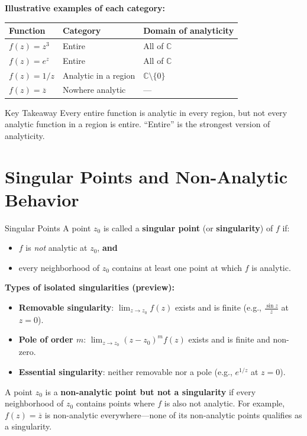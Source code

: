 \documentclass[12pt,a4paper]{article}
\begin{document}
\textbf{Illustrative examples of each category:}

\begin{center}
\begin{tabular}{lll}
\toprule
\textbf{Function} & \textbf{Category} & \textbf{Domain of analyticity} \\
\midrule
$f(z) = z^{3}$ & Entire & All of $\mathbb{C}$ \\
$f(z) = e^{z}$ & Entire & All of $\mathbb{C}$ \\
$f(z) = 1/z$ & Analytic in a region & $\mathbb{C}\setminus\{0\}$ \\
$f(z) = \overline{z}$ & Nowhere analytic & --- \\
\bottomrule
\end{tabular}
\end{center}

\begin{learnbox}{Key Takeaway}
Every entire function is analytic in every region, but not every analytic function in a region is entire. ``Entire'' is the strongest version of analyticity.
\end{learnbox}

\section{Singular Points and Non-Analytic Behavior}

\begin{infobox}{Singular Points}
A point $z_0$ is called a \textbf{singular point} (or \textbf{singularity}) of $f$ if:
\begin{itemize}
  \item $f$ is \emph{not} analytic at $z_0$, \textbf{and}
  \item every neighborhood of $z_0$ contains at least one point at which $f$
        is analytic.
\end{itemize}

\textbf{Types of isolated singularities (preview):}
\begin{itemize}
  \item \textbf{Removable singularity}: $\lim_{z\to z_0}f(z)$ exists and is finite (e.g., $\frac{\sin z}{z}$ at $z=0$).
  \item \textbf{Pole of order $m$}: $\lim_{z\to z_0}(z-z_0)^{m}f(z)$ exists and is finite and non-zero.
  \item \textbf{Essential singularity}: neither removable nor a pole (e.g., $e^{1/z}$ at $z=0$).
\end{itemize}

A point $z_0$ is a \textbf{non-analytic point but not a singularity} if every
neighborhood of $z_0$ contains points where $f$ is also not analytic.
For example, $f(z) = \overline{z}$ is non-analytic everywhere---none of its
non-analytic points qualifies as a singularity.
\end{infobox}
\end{document}
